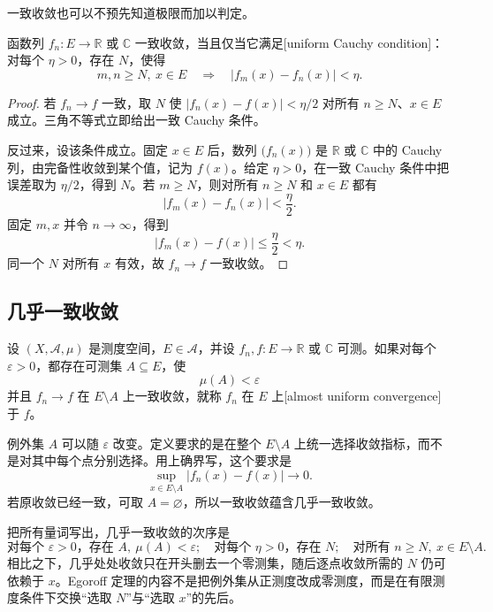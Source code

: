 一致收敛也可以不预先知道极限而加以判定。

\begin{proposition}
\label{b1:prop:uniform-cauchy-criterion}
函数列 \(f_n:E\rightarrow\mathbb R\) 或 \(\mathbb C\) 一致收敛，当且仅当它满足[uniform Cauchy condition]：对每个 \(\eta>0\)，存在 \(N\)，使得
\[
m,n\geq N,\ x\in E
\quad\Longrightarrow\quad
|f_m(x)-f_n(x)|<\eta.
\]
\end{proposition}
\begin{proof}
若 \(f_n\to f\) 一致，取 \(N\) 使
\(|f_n(x)-f(x)|<\eta/2\) 对所有 \(n\geq N\)、\(x\in E\) 成立。三角不等式立即给出一致 Cauchy 条件。

反过来，设该条件成立。固定 \(x\in E\) 后，数列
\(\bigl(f_n(x)\bigr)\) 是 \(\mathbb R\) 或 \(\mathbb C\) 中的 Cauchy 列，由完备性收敛到某个值，记为 \(f(x)\)。给定 \(\eta>0\)，在一致 Cauchy 条件中把误差取为 \(\eta/2\)，得到 \(N\)。若 \(m\geq N\)，则对所有 \(n\geq N\) 和 \(x\in E\) 都有
\[
|f_m(x)-f_n(x)|<\frac{\eta}{2}.
\]
固定 \(m,x\) 并令 \(n\to\infty\)，得到
\[
|f_m(x)-f(x)|\leq\frac{\eta}{2}<\eta.
\]
同一个 \(N\) 对所有 \(x\) 有效，故 \(f_n\to f\) 一致收敛。
\end{proof}

\subsection{几乎一致收敛}
\label{b1:subsec:040502}

\begin{definition}
\label{b1:def:almost-uniform-convergence}
设 \((X,\mathcal A,\mu)\) 是测度空间，\(E\in\mathcal A\)，并设
\(f_n,f:E\rightarrow\mathbb R\) 或 \(\mathbb C\) 可测。如果对每个
\(\varepsilon>0\)，都存在可测集 \(A\subseteq E\)，使
\[
\mu(A)<\varepsilon
\]
并且 \(f_n\to f\) 在 \(E\setminus A\) 上一致收敛，就称
\(f_n\) 在 \(E\) 上[almost uniform convergence]于 \(f\)。
\end{definition}

例外集 \(A\) 可以随 \(\varepsilon\) 改变。定义要求的是在整个
\(E\setminus A\) 上统一选择收敛指标，而不是对其中每个点分别选择。用上确界写，这个要求是
\[
\sup_{x\in E\setminus A}|f_n(x)-f(x)|
\longrightarrow0.
\]
若原收敛已经一致，可取 \(A=\varnothing\)，所以一致收敛蕴含几乎一致收敛。

\ProseParagraphBreak

把所有量词写出，几乎一致收敛的次序是
\[
\text{对每个 }\varepsilon>0\text{，存在 }A,\ \mu(A)<\varepsilon;
\quad
\text{对每个 }\eta>0\text{，存在 }N;
\quad
\text{对所有 }n\geq N,\ x\in E\setminus A.
\]
相比之下，几乎处处收敛只在开头删去一个零测集，随后逐点收敛所需的
\(N\) 仍可依赖于 \(x\)。Egoroff 定理的内容不是把例外集从正测度改成零测度，而是在有限测度条件下交换“选取 \(N\)”与“选取 \(x\)”的先后。

